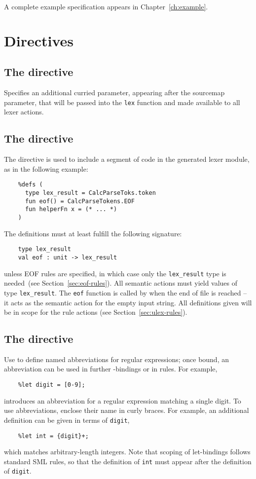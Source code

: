 A complete example specification appears in Chapter~\ref{ch:example}.

\section{Directives}

\subsection{The  directive}

Specifies an additional curried parameter, appearing after the sourcemap parameter, that will be passed into the \texttt{lex} function and made available to all lexer actions.

\subsection{The  directive}

The  directive is used to include a segment of code in the generated lexer module, as in the following example:
\begin{verbatim}
    %defs (
      type lex_result = CalcParseToks.token
      fun eof() = CalcParseTokens.EOF
      fun helperFn x = (* ... *)
    )
\end{verbatim}
The definitions must at least fulfill the following signature:
\begin{verbatim}
    type lex_result
    val eof : unit -> lex_result
\end{verbatim}
unless EOF rules are specified, in which case only the {\tt lex\_result} type is needed~(see Section~\ref{sec:eof-rules}).
All semantic actions must yield values of type {\tt lex\_result}.  The {\tt eof} function is called by \ulex{} when the end of file is reached -- it acts as the semantic action for the empty input string.  All definitions given will be in scope for the rule actions (see Section~\ref{sec:ulex-rules}).

\subsection{The  directive}

Use  to define named abbreviations for regular expressions; once bound, an abbreviation can be used in further -bindings or in rules.  For example,
\begin{verbatim}
    %let digit = [0-9];
\end{verbatim}
introduces an abbreviation for a regular expression matching a single digit.  To use abbreviations, enclose their name in curly braces.  For example, an additional  definition can be given in terms of \texttt{digit},
\begin{verbatim}
    %let int = {digit}+;
\end{verbatim}
which matches arbitrary-length integers.  Note that scoping of let-bindings follows standard SML rules, so that the definition of \texttt{int} must appear after the definition of \texttt{digit}.

